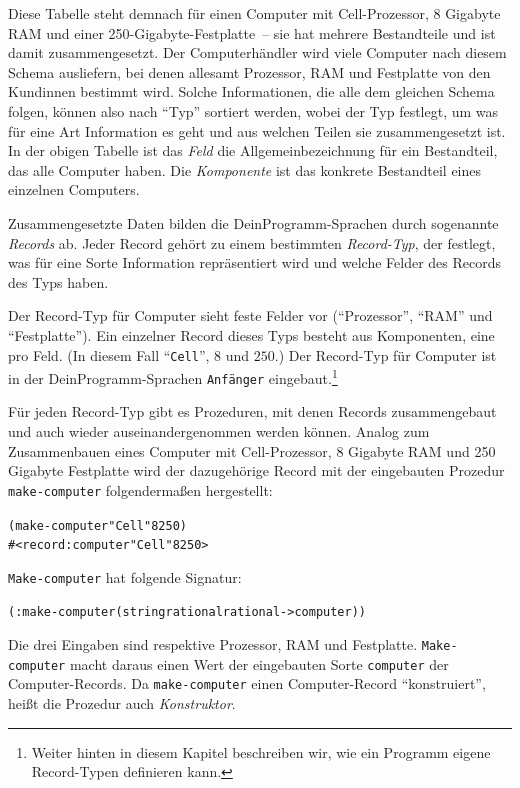 %
Diese Tabelle steht demnach für einen Computer mit Cell-Prozessor, 8
Gigabyte RAM und einer 250-Gigabyte-Festplatte~-- sie hat mehrere
Bestandteile und ist damit zusammengesetzt.  Der Computerhändler wird
viele Computer nach diesem Schema ausliefern, bei denen allesamt
Prozessor, RAM und Festplatte von den Kundinnen bestimmt wird.  Solche
Informationen, die alle dem gleichen Schema folgen, können also nach
"`Typ"' sortiert werden, wobei der Typ
festlegt, um was für eine Art Information es geht und aus welchen
Teilen sie zusammengesetzt ist.  In der obigen Tabelle ist das
\textit{Feld} die Allgemeinbezeichnung für ein Bestandteil, das
alle Computer haben.  Die \textit{Komponente} ist das konkrete
Bestandteil eines einzelnen Computers.

Zusammengesetzte Daten bilden die DeinProgramm-Sprachen durch
sogenannte \textit{Records} ab.  Jeder Record gehört
zu einem bestimmten
\textit{Record-Typ}, der festlegt, was für eine
Sorte Information repräsentiert wird und welche Felder des Records
des Typs haben.

Der Record-Typ für Computer sieht feste Felder
vor ("`Prozessor"', "`RAM"' und "`Festplatte"').  Ein einzelner Record
dieses Typs besteht aus Komponenten, eine pro
Feld. (In diesem Fall "`\texttt{Cell}"', $8$ und $250$.)
Der Record-Typ für Computer ist in der DeinProgramm-Sprachen
\texttt{Anfänger} eingebaut.\footnote{Weiter hinten in diesem Kapitel
  beschreiben wir, wie ein Programm eigene Record-Typen definieren
  kann.}

Für jeden Record-Typ gibt es Prozeduren, mit denen Records
zusammengebaut und auch wieder auseinandergenommen werden können.
Analog zum Zusammenbauen eines Computer mit Cell-Prozessor, 8 Gigabyte
RAM und 250 Gigabyte Festplatte wird der dazugehörige Record mit der
eingebauten Prozedur \texttt{make-computer} folgendermaßen
hergestellt:
%
\begin{alltt}
(make-computer "Cell" 8 250)
\evalsto{} #<record:computer "Cell" 8 250>
\end{alltt}
%
\texttt{Make-computer} hat folgende Signatur:
%
\begin{alltt}
(: make-computer (string rational rational -> computer))
\end{alltt}
%
Die drei Eingaben sind respektive Prozessor, RAM und Festplatte.
\texttt{Make-computer} macht daraus einen Wert der eingebauten Sorte
\texttt{computer} der Computer-Records.  Da \texttt{make-computer}
einen Computer-Record "`konstruiert"', heißt die Prozedur auch
\textit{Konstruktor}.

